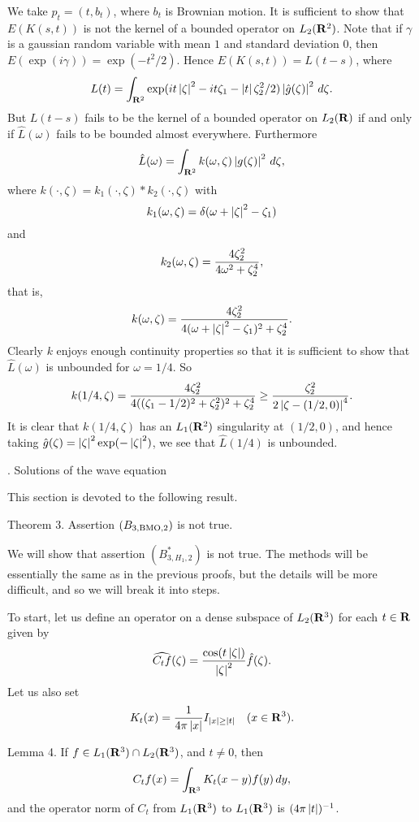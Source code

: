 We take $p_t = (t,b_t)$, where $b_t$ is Brownian motion.  It
is sufficient to show that $E(K(s,t))$ is not the kernel of a bounded
operator on $L_2({\bf R}^2)$.   
Note that if $\gamma$ is a gaussian random variable with mean $1$ and
standard deviation $0$, then $E(\exp(i\gamma)) = \exp(-t^2/2)$.  Hence
$ E(K(s,t)) = L(t-s)$, where
$$ L(t) =
   \int_{{\bf R}^2} \exp(i t \left|\zeta\right|^2 - i t\zeta_1 - \left|t\right| \zeta_2^2/2)
   \left|\hat g(\zeta)\right|^2 \, d\zeta .$$
But $L(t-s)$ fails to be the kernel of a bounded operator on $L_2({\bf R})$ if
and only if $\hat L(\omega)$ fails to be bounded almost everywhere.  
Furthermore
$$ \hat L(\omega) =
   \int_{{\bf R}^2} k(\omega,\zeta) \left|g(\zeta)\right|^2 \, d\zeta ,$$
where $k(\cdot,\zeta) = k_1(\cdot,\zeta)*k_2(\cdot,\zeta)$ with
$$ k_1(\omega,\zeta) = \delta(\omega + \left|\zeta\right|^2 - \zeta_1) $$
and
$$ k_2(\omega,\zeta) = {4\zeta_2^2 \over 4\omega^2 + \zeta_2^4} ,$$
that is,
$$ k(\omega,\zeta) = 
   {4\zeta_2^2 \over 4(\omega + \left|\zeta\right|^2 - \zeta_1)^2 + \zeta_2^4} .$$
Clearly $k$ enjoys enough continuity properties so that it is sufficient
to show that $\hat L(\omega)$ is unbounded for $\omega = 1/4$.  So
$$ k(1/4,\zeta) =
   {4\zeta_2^2 \over 4((\zeta_1-1/2)^2 + \zeta_2^2)^2 + \zeta_2^4}
   \ge
   {\zeta_2^2 \over 2\left|\zeta - (1/2,0)\right|^4 } .$$
It is clear that $k(1/4,\zeta)$ has an $L_1({\bf R}^2)$ singularity at
$(1/2,0)$, and hence taking $\hat g(\zeta) = \left|\zeta\right|^2 
\exp(-\left|\zeta\right|^2)$, we see that $\hat L(1/4)$ is unbounded.

. Solutions of the wave equation

This section is devoted to the following result.

\proclaim Theorem 3.  Assertion $(B_{3,{\rm BMO},2})$ is not true.

We will show that assertion $(B^*_{3,H_1,2})$ is not
true.  The methods will be essentially the same as in the previous
proofs, but the details will
be more difficult, and so we will break it into steps.

To start, let us define an operator on a dense subspace of
$L_2({\bf R}^3)$ for each
$t\in {\bf R}$ given by
$$ \widehat{C_t f}(\zeta) =  {\cos(t\left|\zeta\right|) \over \left|\zeta\right|^2 }
   \hat f(\zeta) .$$
Let us also set
$$ K_t(x) = {1\over 4 \pi \left|x\right|} 
   I_{\left|x\right| \ge \left|t\right|} \quad (x\in{\bf R}^3) .$$

\proclaim Lemma 4.  If $f \in L_1({\bf R}^3) \cap L_2({\bf R}^3)$, and
$t \ne 0$, then
$$ C_t f(x) = \int_{{\bf R}^3} K_t(x-y) f(y) \, dy ,$$
and the operator norm of $C_t$ from $L_1({\bf R}^3)$ to $L_1({\bf R}^3)$ is
$(4\pi\left|t\right|)^{-1}$.


